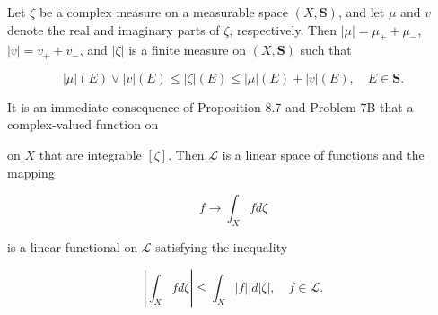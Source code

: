 Let $\zeta$ be a complex measure on a measurable space $(X, \mathbf{S})$, and let $\mu$ and $v$ denote the real and imaginary parts of $\zeta$, respectively. Then $|\mu| = \mu_+ + \mu_-$, $|v| = v_+ + v_-$, and $|\zeta|$ is a finite measure on $(X, \mathbf{S})$ such that

$$|\mu|(E) \vee |v|(E) \leq |\zeta|(E) \leq |\mu|(E) + |v|(E), \quad E \in \mathbf{S}.$$

It is an immediate consequence of Proposition 8.7 and Problem 7B that a complex-valued function on

on $X$ that are integrable $[\zeta]$. Then $\mathcal{L}$ is a linear space of functions and the mapping

$$f \rightarrow \int_X f d\zeta$$

is a linear functional on $\mathcal{L}$ satisfying the inequality

$$\left| \int_X f d\zeta \right| \leq \int_X |f| |d|\zeta|, \quad f \in \mathcal{L}. \tag{8}$$
